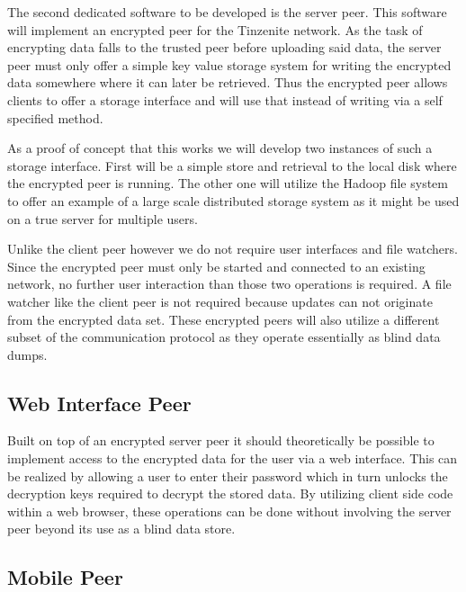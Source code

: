 The second dedicated software to be developed is the server peer.
This software will implement an encrypted peer for the Tinzenite network.
As the task of encrypting data falls to the trusted peer before uploading said data, the server peer must only offer a simple key value storage system for writing the encrypted data somewhere where it can later be retrieved.
Thus the encrypted peer allows clients to offer a storage interface and will use that instead of writing via a self specified method.

As a proof of concept that this works we will develop two instances of such a storage interface.
First will be a simple store and retrieval to the local disk where the encrypted peer is running.
The other one will utilize the Hadoop file system to offer an example of a large scale distributed storage system as it might be used on a true server for multiple users.

Unlike the client peer however we do not require user interfaces and file watchers.
Since the encrypted peer must only be started and connected to an existing network, no further user interaction than those two operations is required.
A file watcher like the client peer is not required because updates can not originate from the encrypted data set.
These encrypted peers will also utilize a different subset of the communication protocol as they operate essentially as blind data dumps.

\subsection{Web Interface Peer}
\label{sub:Web Interface Peer}

Built on top of an encrypted server peer it should theoretically be possible to implement access to the encrypted data for the user via a web interface.
This can be realized by allowing a user to enter their password which in turn unlocks the decryption keys required to decrypt the stored data.
By utilizing client side code within a web browser, these operations can be done without involving the server peer beyond its use as a blind data store.

\subsection{Mobile Peer}

